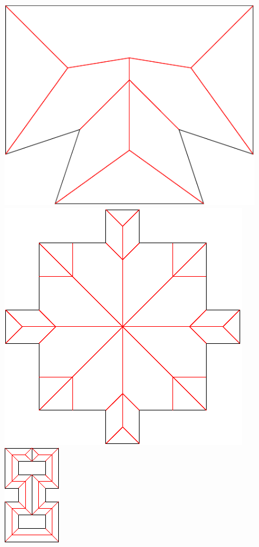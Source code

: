 \begin{figure}[htbp]
\begin{ccTexOnly}
\begin{center}
\includegraphics{Straight_skeleton_2/simple_skeleton_0} %
\end{center}
\begin{center}
\includegraphics{Straight_skeleton_2/simple_skeleton_1} %
\end{center}
\begin{center}
\includegraphics{Straight_skeleton_2/validly_touching} %
\end{center}
\end{ccTexOnly}


\end{figure}

